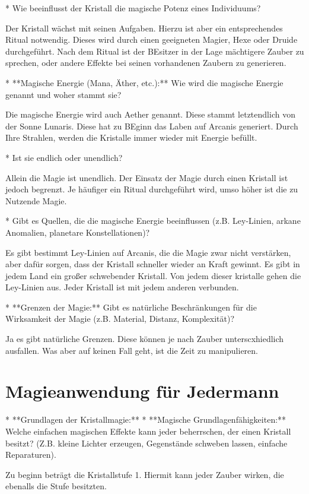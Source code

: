 \documentclass[10pt,a4paper,twocolumn,openany]{book}
\begin{document}
* Wie beeinflusst der Kristall die magische Potenz eines Individuums?

Der Kristall wächst mit seinen Aufgaben. Hierzu ist aber ein entsprechendes Ritual notwendig. Dieses wird durch einen geeigneten Magier, Hexe oder Druide durchgeführt.
Nach dem Ritual ist der BEsitzer in der Lage mächtigere Zauber zu sprechen, oder andere Effekte bei seinen vorhandenen Zaubern zu generieren.

* **Magische Energie (Mana, Äther, etc.):** Wie wird die magische Energie genannt und woher stammt sie?

Die magische Energie wird auch Aether genannt. Diese stammt letztendlich von der Sonne Lunaris. Diese hat zu BEginn das Laben auf Arcanis generiert. Durch Ihre Strahlen, werden die Kristalle immer wieder mit Energie befüllt.

* Ist sie endlich oder unendlich?

Allein die Magie ist unendlich. Der Einsatz der Magie durch einen Kristall ist jedoch begrenzt. Je häufiger ein Ritual durchgeführt wird, umso höher ist die zu Nutzende Magie.

* Gibt es Quellen, die die magische Energie beeinflussen (z.B. Ley-Linien, arkane Anomalien, planetare Konstellationen)?

Es gibt bestimmt Ley-Linien auf Arcanis, die die Magie zwar nicht verstärken, aber dafür sorgen, dass der Kristall schneller wieder an Kraft gewinnt. Es gibt in jedem Land ein großer schwebender Kristall.
Von jedem dieser kristalle gehen die Ley-Linien aus. Jeder Kristall ist mit jedem anderen verbunden.

* **Grenzen der Magie:** Gibt es natürliche Beschränkungen für die Wirksamkeit der Magie (z.B. Material, Distanz, Komplexität)?

Ja es gibt natürliche Grenzen. Diese können je nach Zauber unterscxhiedlich ausfallen. Was aber auf keinen Fall geht, ist die Zeit zu manipulieren.



\chapter{Magieanwendung für Jedermann}

* **Grundlagen der Kristallmagie:**
* **Magische Grundlagenfähigkeiten:** Welche einfachen magischen Effekte kann jeder beherrschen, der einen Kristall besitzt? (Z.B. kleine Lichter erzeugen, Gegenstände schweben lassen, einfache Reparaturen).

Zu beginn beträgt die Kristallstufe 1. Hiermit kann jeder Zauber wirken, die ebenalls die Stufe besitzten. 
\end{document}
